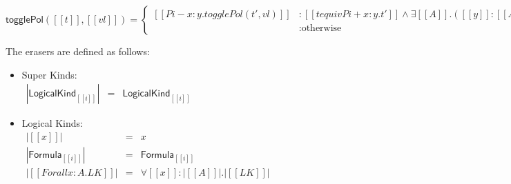 \begin{definition}
  \label{def:asep3_togglepol}  
  \begin{center}
    \begin{math}
      \mathsf{togglePol} ([[t]], [[vl]]) = \left\{
        \begin{array}{ll}
          [[Pi - x : y.togglePol(t',vl)]]    & : [[t equiv Pi + x : y.t']] \land \exists [[A]].([[y]]:[[A]]) \in [[vl]]\\
          [[Pi ep x : A . togglePol(t',vl)]] & : \text{otherwise}
        \end{array}
      \right.
    \end{math}
  \end{center}
\end{definition}

\begin{definition}
  \label{def:eraser_function}
  The erasers are defined as follows:
  \begin{itemize}
  \item Super Kinds:\\
    \begin{math}
      \begin{array}{lll}
        |\mathsf{LogicalKind}_{[[i]]}| & = & \mathsf{LogicalKind}_{[[i]]}
      \end{array}
    \end{math}
  \item Logical Kinds:\\
    \begin{math}
      \begin{array}{lll}
        |[[x]]|                   & = & x\\
        |\mathsf{Formula}_{[[i]]}| & = & \mathsf{Formula}_{{[[i]]}}\\
        |[[Forall x : A . LK]]|   & = & \forall [[x]] : |[[A]]|.|[[LK]]|
      \end{array}
    \end{math}
    

\end{itemize}
\end{definition}
